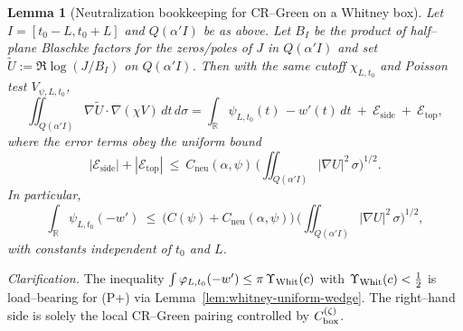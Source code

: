 \documentclass[11pt]{article}
\newtheorem{lemma}[theorem]{Lemma}
\theoremstyle{definition}
\theoremstyle{remark}
\newcommand{\R}{\mathbb{R}}
\begin{document}
\begin{lemma}[Neutralization bookkeeping for CR–Green on a Whitney box]\label{lem:neutralization-bookkeeping}
Let $I=[t_0{-}L,t_0{+}L]$ and $Q(\alpha'I)$ be as above. Let $B_I$ be the product of half–plane Blaschke factors for the zeros/poles of $J$ in $Q(\alpha'I)$ and set $\widetilde U:=\Re\log(J/B_I)$ on $Q(\alpha'I)$. Then with the same cutoff $\chi_{L,t_0}$ and Poisson test $V_{\psi,L,t_0}$,
\[
 \iint_{Q(\alpha'I)} \nabla \widetilde U\cdot\nabla(\chi V)\,dt\,d\sigma
 = \int_{\R} \psi_{L,t_0}(t)\,-w'(t)\,dt\ +\ \mathcal E_{\mathrm{side}}\ +\ \mathcal E_{\mathrm{top}},
\]
where the error terms obey the uniform bound
\[
 |\mathcal E_{\mathrm{side}}|+|\mathcal E_{\mathrm{top}}|
 \ \le\ C_{\mathrm{neu}}(\alpha,\psi)\,\Big(\iint_{Q(\alpha'I)} |\nabla U|^2\,\sigma\Big)^{1/2}.
\]
In particular,
\[
  \int_{\R} \psi_{L,t_0}(-w')\ \le\ \big(C(\psi)+C_{\mathrm{neu}}(\alpha,\psi)\big)\,\Big(\iint_{Q(\alpha'I)} |\nabla U|^2\,\sigma\Big)^{1/2},
\]
with constants independent of $t_0$ and $L$.
\end{lemma}
\noindent\emph{Clarification.} The inequality $\int \varphi_{L,t_0}(-w') \le \pi\,\Upsilon_{\rm Whit}(c)$ with $\Upsilon_{\rm Whit}(c)<\tfrac12$ is load–bearing for \textup{(P+)} via Lemma~\ref{lem:whitney-uniform-wedge}. The right–hand side is solely the local CR–Green pairing controlled by $C_{\rm box}^{(\zeta)}$.
\end{document}
